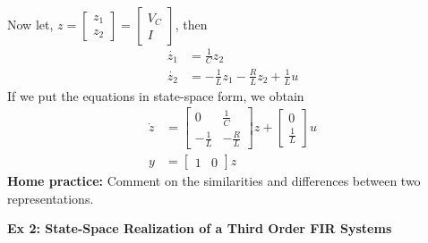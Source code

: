 \documentclass[twoside]{article}
\begin{document}
Now let, $z = \left[ \begin{array}{c} z_1 \\ z_2 \end{array} \right] =
\left[ \begin{array}{c} V_C \\ I \end{array} \right]$, then 
%
\begin{align*}
	\dot{z_1} &= \frac{1}{C} z_2 \\
	\dot{z_2} &= -\frac{1}{L} z_1 - \frac{R}{L} z_2 + \frac{1}{L} u
\end{align*}
%
If we put the equations in state-space form, we obtain
%
\begin{align*}
 \dot{z} &= \left[  \begin{array}{cc} 0 & \frac{1}{C} \\ -\frac{1}{L} &  -\frac{R}{L}  \end{array} \right] z 
 +  \left[  \begin{array}{c} 0 \\ \frac{1}{L} \end{array} \right] u
 \\
 y &= \left[  \begin{array}{cc} 1 & 0 \end{array} \right] z
\end{align*}
%
\textbf{Home practice:} Comment on the similarities and differences between two representations.

\newpage

\textbf{Ex 2: State-Space Realization of a Third Order FIR Systems}
\end{document}
